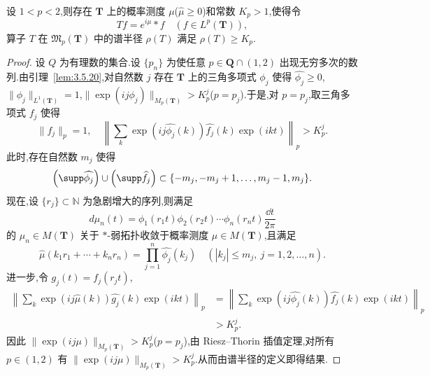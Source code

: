 \begin{theorem}\label{thm:3.5.21}
设 $1 < p < 2$,则存在 $\mathbf{T}$ 上的概率测度 $\mu$($\hat{\mu} \geq 0$)和常数 $K_{p} > 1$,使得令
\begin{equation*}
Tf = e^{i\mu} * f \quad (f \in L^{p}(\mathbf{T})),
\end{equation*}
算子 $T$ 在 $\mathfrak{M}_{p}(\mathbf{T})$ 中的谱半径 $\rho(T)$ 满足 $\rho(T) \geq K_{p}$.
\end{theorem}

\begin{proof}
设 $Q$ 为有理数的集合.设 $\{p_{n}\}$ 为使任意 $p \in \mathbf{Q} \cap (1, 2)$ 出现无穷多次的数列.由引理~\ref{lem:3.5.20},对自然数 $j$ 存在 $\mathbf{T}$ 上的三角多项式 $\phi_{j}$ 使得 $\widehat{\phi_{j}} \geq 0$,$\|\phi_{j}\|_{L^{1}(\mathbf{T})} = 1$,$\|\exp(ij\phi_{j})\|_{M_{p}(\mathbf{T})} > K_{p}^{j}$($p = p_{j}$).于是,对 $p = p_{j}$,取三角多项式 $f_{j}$ 使得
\begin{equation*}
\|f_{j}\|_{p} = 1, \quad \left\|\sum_{k}\exp(ij\widehat{\phi_{j}}(k))\widehat{f_{j}}(k)\exp(ikt)\right\|_{p} > K_{p}^{j}.
\end{equation*}
此时,存在自然数 $m_{j}$ 使得
\begin{equation*}
\left(\supp\widehat{\phi_{j}}\right) \cup \left(\supp\widehat{f_{j}}\right) \subset \{-m_{j}, -m_{j} + 1, \ldots, m_{j} - 1, m_{j}\}.
\end{equation*}
现在,设 $\{r_{j}\} \subset \mathbb{N}$ 为急剧增大的序列,则满足
\begin{equation*}
d\mu_{n}(t) = \phi_{1}(r_{1}t)\phi_{2}(r_{2}t)\cdots\phi_{n}(r_{n}t)\frac{\dd t}{2\pi}
\end{equation*}
的 $\mu_{n}\in M(\mathbf{T})$ 关于 $*$-弱拓扑收敛于概率测度 $\mu\in M(\mathbf{T})$,且满足
\begin{equation*}
\widehat{\mu}(k_{1}r_{1} + \cdots + k_{n}r_{n}) = \prod_{j=1}^{n}\widehat{\phi_{j}}(k_{j}) \quad (|k_{j}| \leq m_{j},\ j = 1, 2, \ldots, n).
\end{equation*}
进一步,令 $g_{j}(t)=f_{j}(r_{j}t)$,
\begin{align*}
\left\|\sum_{k}\exp(ij\widehat{\mu}(k))\widehat{g_{j}}(k)\exp(ikt)\right\|_{p} &= \left\|\sum_{k}\exp(ij\widehat{\phi_{j}}(k))\widehat{f_{j}}(k)\exp(ikt)\right\|_{p}\\
&> K_{p}^{j}.
\end{align*}
因此 $\|\exp(ij\mu)\|_{M_{p}(\mathbf{T})}>K_{p}^{j}$($p=p_{j}$),由 Riesz--Thorin 插值定理,对所有 $p\in(1,2)$ 有 $\|\exp(ij\mu)\|_{M_{p}(\mathbf{T})}>K_{p}^{j}$.从而由谱半径的定义即得结果.
\end{proof}

